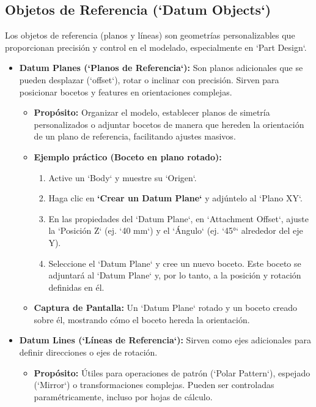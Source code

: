 \documentclass[12pt]{article}
\begin{document}
\subsection{Objetos de Referencia (`Datum Objects`)}
Los objetos de referencia (planos y líneas) son geometrías personalizables que proporcionan precisión y control en el modelado, especialmente en `Part Design`.
\begin{itemize}[label=\textbullet]
    \item \textbf{Datum Planes (`Planos de Referencia`):} Son planos adicionales que se pueden desplazar (`offset`), rotar o inclinar con precisión. Sirven para posicionar bocetos y features en orientaciones complejas.
    \begin{itemize}[label=\textendash]
        \item \textbf{Propósito:} Organizar el modelo, establecer planos de simetría personalizados o adjuntar bocetos de manera que hereden la orientación de un plano de referencia, facilitando ajustes masivos.
        \item \textbf{Ejemplo práctico (Boceto en plano rotado):}
        \begin{enumerate}[label=\arabic*)]
            \item Active un `Body` y muestre su `Origen`.
            \item Haga clic en \textbf{`Crear un Datum Plane`} y adjúntelo al `Plano XY`.
            \item En las propiedades del `Datum Plane`, en `Attachment Offset`, ajuste la `Posición Z` (ej. `40 mm`) y el `Ángulo` (ej. `45°` alrededor del eje Y).
            \item Seleccione el `Datum Plane` y cree un nuevo boceto. Este boceto se adjuntará al `Datum Plane` y, por lo tanto, a la posición y rotación definidas en él.
        \end{enumerate}
        \item \textbf{Captura de Pantalla:} Un `Datum Plane` rotado y un boceto creado sobre él, mostrando cómo el boceto hereda la orientación.
    \end{itemize}
    \item \textbf{Datum Lines (`Líneas de Referencia`):} Sirven como ejes adicionales para definir direcciones o ejes de rotación.
    \begin{itemize}[label=\textendash]
        \item \textbf{Propósito:} Útiles para operaciones de patrón (`Polar Pattern`), espejado (`Mirror`) o transformaciones complejas. Pueden ser controladas paramétricamente, incluso por hojas de cálculo.

\end{itemize}
\end{itemize}
\end{document}
